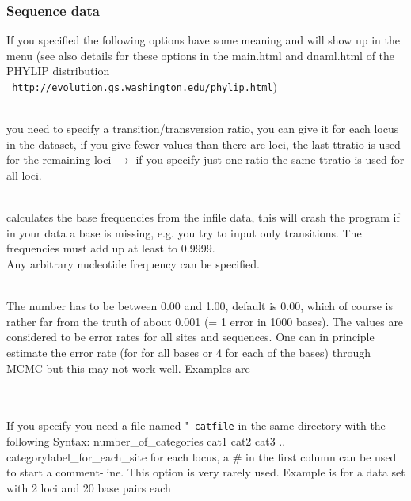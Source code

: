\subsubsection{Sequence data}
If you specified {} the following options have some meaning and will show up in the menu (see also details for these options in the main.html and dnaml.html of the PHYLIP distribution\\
\texttt{ http://evolution.gs.washington.edu/phylip.html})
\begin{description}
\item{}\\ you need to specify a
transition/transversion ratio, you can give it for each locus in the
dataset, if you give fewer values than there are loci, the last
ttratio is used for the remaining loci $\rightarrow$ if you specify
just one ratio the same ttratio is used for all loci.
\item{}\\
{}
 calculates the base frequencies from the infile data, this will
 crash the program if in your data a base is missing, e.g. you try
 to input only transitions. The frequencies must add up at least to 0.9999.\\
{}
Any arbitrary nucleotide frequency can be specified.
\item{\\ 
The number has to be between 0.00 and
1.00, default is 0.00, which of course is rather far from the truth of
about 0.001 (= 1 error in 1000 bases). The values are considered to be error rates for all sites and sequences. One can in principle estimate the error rate (for for all bases or 4 for each of the bases) through MCMC but this may not work well. Examples are\\
\\
}
\item{}\\
 If you specify {} you need a file named "\texttt{ catfile} in the same  directory
 with the following Syntax:
 number\_of\_categories cat1 cat2 cat3 .. categorylabel\_for\_each\_site
 for each locus, a \#  in the first column can be used to start a comment-line. This option is very rarely used. 
 Example is for a data set with 2 loci and 20 base pairs each

\end{description}
